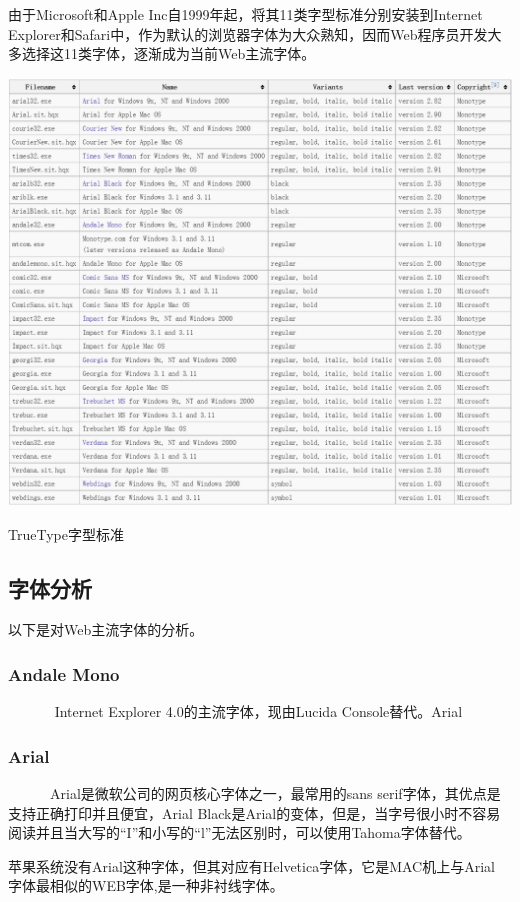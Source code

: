 \documentclass[a4paper]{article}
\begin{document}
由于Microsoft和Apple Inc自1999年起，将其11类字型标准分别安装到Internet Explorer和Safari中，作为默认的浏览器字体为大众熟知，因而Web程序员开发大多选择这11类字体，逐渐成为当前Web主流字体。

\makeatletter
\def\@captype{figure}
\makeatother
\centerline{\includegraphics [width=1.3\textwidth]{cyt1.png} }
\caption{TrueType字型标准}
\label{cyt1}

\subsection{字体分析}

以下是对Web主流字体的分析。

	\subsubsection{Andale Mono} 	
~~~~~~	Internet Explorer 4.0的主流字体，现由Lucida Console替代。Arial

	\subsubsection{Arial} 
	
~~~~~~Arial是微软公司的网页核心字体之一，最常用的sans serif字体，其优点是支持正确打印并且便宜，Arial Black是Arial的变体，但是，当字号很小时不容易阅读并且当大写的“I”和小写的“l”无法区别时，可以使用Tahoma字体替代。
	
苹果系统没有Arial这种字体，但其对应有Helvetica字体，它是MAC机上与Arial 字体最相似的WEB字体,是一种非衬线字体\cite{cyt6}。
	
\end{document}
